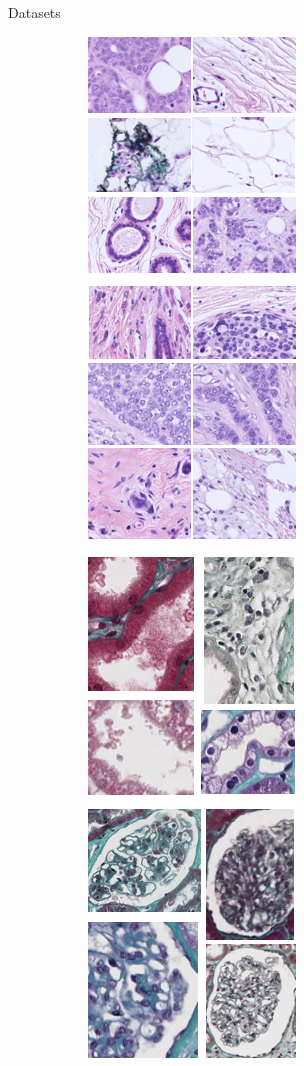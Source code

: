\documentclass{beamer}
\begin{document}
\begin{frame}{Datasets}
\begin{figure}
    \begin{subfigure}{0.1\textwidth}\includegraphics[scale=0.35]{images/illus_breast.png}\end{subfigure}
    \begin{subfigure}{0.1\textwidth}\includegraphics[scale=0.35]{images/illus_glomeruli.png}\end{subfigure}
\end{figure}

\end{frame}
\end{document}
